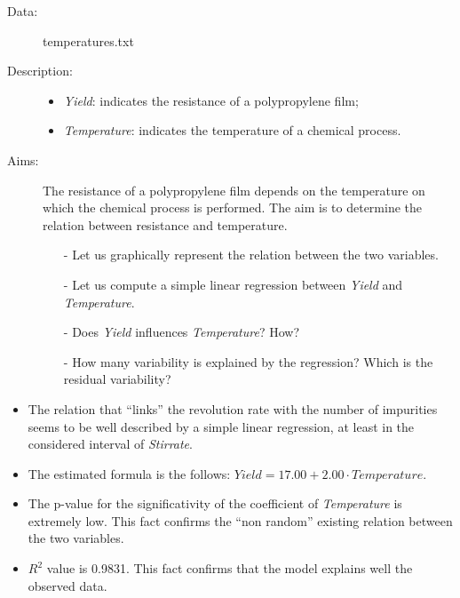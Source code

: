 \begin{frame}
  \begin{description}
    \item[Data: ]temperatures.txt \\ 
    \item[Description: ]
      \begin{footnotesize}
        \begin{itemize}
          \item \textit{Yield}: indicates the resistance of a polypropylene film;
          \item \textit{Temperature}: indicates the temperature of a chemical process.
        \end{itemize}
      \end{footnotesize}
    \item[Aims: ]
      \begin{footnotesize}
        The resistance of a polypropylene film depends on the temperature on which the chemical process is performed. The aim is to determine the relation between resistance and temperature.
        \begin{itemize}
          \item[-] Let us graphically represent the relation between the two variables.
          \item[-] Let us compute a simple linear regression between \textit{Yield} and \textit{Temperature}.
          \item[-] Does \textit{Yield} influences \textit{Temperature}? How?
          \item[-] How many variability is explained by the regression? Which is the residual variability?    
        \end{itemize}
      \end{footnotesize}
  \end{description}
\end{frame}

\begin{frame}
    \begin{itemize}
      \item The relation  that ``links'' the revolution rate with the number of impurities seems to be well described by a simple linear regression, at least in the considered interval of \textit{Stirrate}. 
      \item The estimated formula is the follows: $ Yield = 17.00 + 2.00 \cdot Temperature $.
      \item The p-value for the significativity of the coefficient of \textit{Temperature} is extremely low. This fact confirms the ``non random'' existing relation between the two variables.
      \item $ R^2 $ value is 0.9831. This fact confirms that the model explains well the observed data.
    \end{itemize}
\end{frame}

